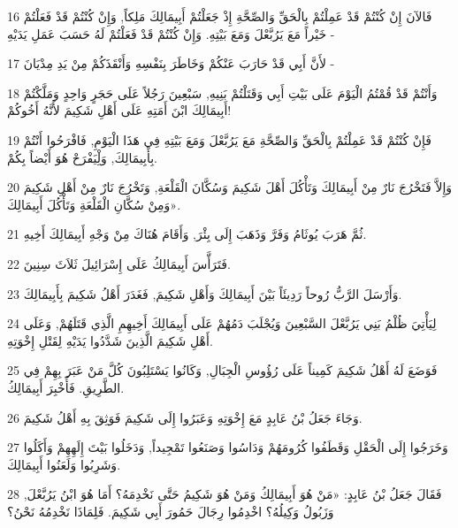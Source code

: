 \par 16 فَالآنَ إِنْ كُنْتُمْ قَدْ عَمِلْتُمْ بِالْحَقِّ وَالصِّحَّةِ إِذْ جَعَلْتُمْ أَبِيمَالِكَ مَلِكاً, وَإِنْ كُنْتُمْ قَدْ فَعَلْتُمْ خَيْراً مَعَ يَرُبَّعْلَ وَمَعَ بَيْتِهِ. وَإِنْ كُنْتُمْ قَدْ فَعَلْتُمْ لَهُ حَسَبَ عَمَلِ يَدَيْهِ -
\par 17 لأَنَّ أَبِي قَدْ حَارَبَ عَنْكُمْ وَخَاطَرَ بِنَفْسِهِ وَأَنْقَذَكُمْ مِنْ يَدِ مِدْيَانَ -
\par 18 وَأَنْتُمْ قَدْ قُمْتُمُ الْيَوْمَ عَلَى بَيْتِ أَبِي وَقَتَلْتُمْ بَنِيهِ, سَبْعِينَ رَجُلاً عَلَى حَجَرٍ وَاحِدٍ وَمَلَّكْتُمْ أَبِيمَالِكَ ابْنَ أَمَتِهِ عَلَى أَهْلِ شَكِيمَ لأَنَّهُ أَخُوكُمْ!
\par 19 فَإِنْ كُنْتُمْ قَدْ عَمِلْتُمْ بِالْحَقِّ وَالصِّحَّةِ مَعَ يَرُبَّعْلَ وَمَعَ بَيْتِهِ فِي هَذَا الْيَوْمِ, فَافْرَحُوا أَنْتُمْ بِأَبِيمَالِكَ, وَلِْيَفْرَحْ هُوَ أَيْضاً بِكُمْ.
\par 20 وَإِلاَّ فَتَخْرُجَ نَارٌ مِنْ أَبِيمَالِكَ وَتَأْكُلَ أَهْلَ شَكِيمَ وَسُكَّانَ الْقَلْعَةِ, وَتَخْرُجَ نَارٌ مِنْ أَهْلِ شَكِيمَ وَمِنْ سُكَّانِ الْقَلْعَةِ وَتَأْكُلَ أَبِيمَالِكَ».
\par 21 ثُمَّ هَرَبَ يُوثَامُ وَفَرَّ وَذَهَبَ إِلَى بِئْرَ, وَأَقَامَ هُنَاكَ مِنْ وَجْهِ أَبِيمَالِكَ أَخِيهِ.
\par 22 فَتَرَأَّسَ أَبِيمَالِكُ عَلَى إِسْرَائِيلَ ثَلاَثَ سِنِينَ.
\par 23 وَأَرْسَلَ الرَّبُّ رُوحاً رَدِيئَاً بَيْنَ أَبِيمَالِكَ وَأَهْلِ شَكِيمَ, فَغَدَرَ أَهْلُ شَكِيمَ بِأَبِيمَالِكَ.
\par 24 لِيَأْتِيَ ظُلْمُ بَنِي يَرُبَّعْلَ السَّبْعِينَ وَيُجْلَبَ دَمُهُمْ عَلَى أَبِيمَالِكَ أَخِيهِمِ الَّذِي قَتَلَهُمْ, وَعَلَى أَهْلِ شَكِيمَ الَّذِينَ شَدَّدُوا يَدَيْهِ لِقَتْلِ إِخْوَتِهِ.
\par 25 فَوَضَعَ لَهُ أَهْلُ شَكِيمَ كَمِيناً عَلَى رُؤُوسِ الْجِبَالِ, وَكَانُوا يَسْتَلِبُونَ كُلَّ مَنْ عَبَرَ بِهِمْ فِي الطَّرِيقِ. فَأُخْبِرَ أَبِيمَالِكُ.
\par 26 وَجَاءَ جَعَلُ بْنُ عَابِدٍ مَعَ إِخْوَتِهِ وَعَبَرُوا إِلَى شَكِيمَ فَوَثِقَ بِهِ أَهْلُ شَكِيمَ.
\par 27 وَخَرَجُوا إِلَى الْحَقْلِ وَقَطَفُوا كُرُومَهُمْ وَدَاسُوا وَصَنَعُوا تَمْجِيداً, وَدَخَلُوا بَيْتَ إِلَهِهِمْ وَأَكَلُوا وَشَرِبُوا وَلَعَنُوا أَبِيمَالِكَ.
\par 28 فَقَالَ جَعَلُ بْنُ عَابِدٍ: «مَنْ هُوَ أَبِيمَالِكُ وَمَنْ هُوَ شَكِيمُ حَتَّى نَخْدِمَهُ؟ أَمَا هُوَ ابْنُ يَرُبَّعْلَ, وَزَبُولُ وَكِيلُهُ؟ اخْدِمُوا رِجَالَ حَمُورَ أَبِي شَكِيمَ. فَلِمَاذَا نَخْدِمُهُ نَحْنُ؟
